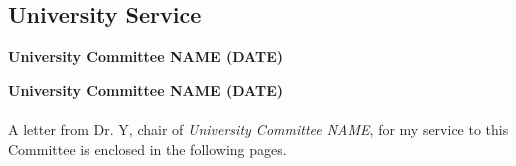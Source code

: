 \newpage
{}
\label{University_Professional_Service}






\newpage
\subsection{University Service}
{\bf University Committee NAME (DATE)} \\
\blindtext
%

{\bf University Committee NAME (DATE)} \\
\blindtext \\

A letter from Dr. Y, chair of {\it University Committee NAME}, for my service to this Committee is enclosed in the following pages.




